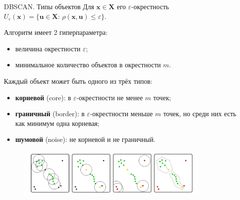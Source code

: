 \documentclass[unicode, notheorems, handout]{beamer}
\begin{document}
\begin{frame}{DBSCAN. Типы объектов}
\small 
Для $\pmb{x}\in \pmb{X}$ его $\varepsilon$-окрестность $U_\varepsilon(\pmb{x})=\{ \pmb{u}\in \pmb{X}:\, \rho (\pmb{x}, \pmb{u})\leqslant \varepsilon\}$.
\vspace{1ex}


Алгоритм имеет 2 гиперпараметра:
\begin{itemize}
  \item[\ding{87}] величина окрестности $\varepsilon$;
  \item[\ding{87}]  минимальное количество объектов в окрестности $m$.
\end{itemize}
\vspace{1ex}

Каждый объект может быть одного из трёх типов:
\begin{itemize}
    \item \textbf{корневой} (core): в $\varepsilon$-окрестности не менее $m$ точек;
    \vspace{0.5ex}
    
    \item \textbf{граничный} (border): в $\varepsilon$-окрестности меньше $m$ точек, но среди них есть как минимум одна корневая;
    \vspace{0.5ex}
    
    \item \textbf{шумовой} (noise): не корневой и не граничный. 
\end{itemize}
\vspace{-1.5ex}

     \begin{figure}[h]
        \centering
        \includegraphics[width=0.85\textwidth]{dbscan_alg.jpg} 
    \end{figure}
                 
\end{frame}
\end{document}
